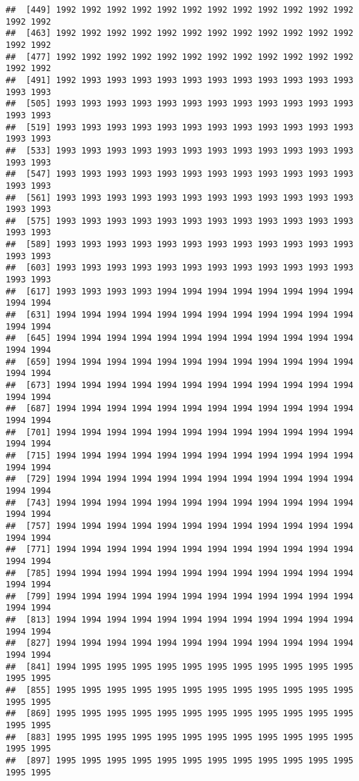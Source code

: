 \documentclass[
]{article}
\begin{document}
\begin{verbatim}
##  [449] 1992 1992 1992 1992 1992 1992 1992 1992 1992 1992 1992 1992 1992 1992
##  [463] 1992 1992 1992 1992 1992 1992 1992 1992 1992 1992 1992 1992 1992 1992
##  [477] 1992 1992 1992 1992 1992 1992 1992 1992 1992 1992 1992 1992 1992 1992
##  [491] 1992 1993 1993 1993 1993 1993 1993 1993 1993 1993 1993 1993 1993 1993
##  [505] 1993 1993 1993 1993 1993 1993 1993 1993 1993 1993 1993 1993 1993 1993
##  [519] 1993 1993 1993 1993 1993 1993 1993 1993 1993 1993 1993 1993 1993 1993
##  [533] 1993 1993 1993 1993 1993 1993 1993 1993 1993 1993 1993 1993 1993 1993
##  [547] 1993 1993 1993 1993 1993 1993 1993 1993 1993 1993 1993 1993 1993 1993
##  [561] 1993 1993 1993 1993 1993 1993 1993 1993 1993 1993 1993 1993 1993 1993
##  [575] 1993 1993 1993 1993 1993 1993 1993 1993 1993 1993 1993 1993 1993 1993
##  [589] 1993 1993 1993 1993 1993 1993 1993 1993 1993 1993 1993 1993 1993 1993
##  [603] 1993 1993 1993 1993 1993 1993 1993 1993 1993 1993 1993 1993 1993 1993
##  [617] 1993 1993 1993 1993 1994 1994 1994 1994 1994 1994 1994 1994 1994 1994
##  [631] 1994 1994 1994 1994 1994 1994 1994 1994 1994 1994 1994 1994 1994 1994
##  [645] 1994 1994 1994 1994 1994 1994 1994 1994 1994 1994 1994 1994 1994 1994
##  [659] 1994 1994 1994 1994 1994 1994 1994 1994 1994 1994 1994 1994 1994 1994
##  [673] 1994 1994 1994 1994 1994 1994 1994 1994 1994 1994 1994 1994 1994 1994
##  [687] 1994 1994 1994 1994 1994 1994 1994 1994 1994 1994 1994 1994 1994 1994
##  [701] 1994 1994 1994 1994 1994 1994 1994 1994 1994 1994 1994 1994 1994 1994
##  [715] 1994 1994 1994 1994 1994 1994 1994 1994 1994 1994 1994 1994 1994 1994
##  [729] 1994 1994 1994 1994 1994 1994 1994 1994 1994 1994 1994 1994 1994 1994
##  [743] 1994 1994 1994 1994 1994 1994 1994 1994 1994 1994 1994 1994 1994 1994
##  [757] 1994 1994 1994 1994 1994 1994 1994 1994 1994 1994 1994 1994 1994 1994
##  [771] 1994 1994 1994 1994 1994 1994 1994 1994 1994 1994 1994 1994 1994 1994
##  [785] 1994 1994 1994 1994 1994 1994 1994 1994 1994 1994 1994 1994 1994 1994
##  [799] 1994 1994 1994 1994 1994 1994 1994 1994 1994 1994 1994 1994 1994 1994
##  [813] 1994 1994 1994 1994 1994 1994 1994 1994 1994 1994 1994 1994 1994 1994
##  [827] 1994 1994 1994 1994 1994 1994 1994 1994 1994 1994 1994 1994 1994 1994
##  [841] 1994 1995 1995 1995 1995 1995 1995 1995 1995 1995 1995 1995 1995 1995
##  [855] 1995 1995 1995 1995 1995 1995 1995 1995 1995 1995 1995 1995 1995 1995
##  [869] 1995 1995 1995 1995 1995 1995 1995 1995 1995 1995 1995 1995 1995 1995
##  [883] 1995 1995 1995 1995 1995 1995 1995 1995 1995 1995 1995 1995 1995 1995
##  [897] 1995 1995 1995 1995 1995 1995 1995 1995 1995 1995 1995 1995 1995 1995

\end{verbatim}
\end{document}
